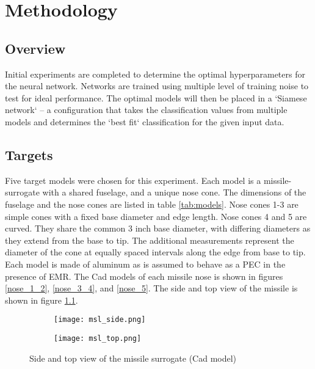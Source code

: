 \chapter{Methodology}
\label{ch:methodology}
\glsresetall

\section{Overview}

Initial experiments are completed to determine the optimal hyperparameters for the neural network. Networks are trained using multiple level of training noise to test for ideal performance. The optimal models will then be placed in a `Siamese network` --  a configuration that takes the classification values from multiple models and determines the `best fit` classification for the given input data.

\section{Targets}

  Five target models were chosen for this experiment. Each model is a missile-surrogate with a shared fuselage, and a unique nose cone. The dimensions of the fuselage and the nose cones are listed in table \ref{tab:models}. Nose cones 1-3 are simple cones with a fixed base diameter and edge length. Nose cones 4 and 5 are curved. They share the common 3 inch base diameter, with  differing diameters as they extend from the base to tip. The additional measurements represent the diameter of the cone at equally spaced intervals along the edge from base to tip. Each model is made of aluminum as is assumed to behave as a PEC in the presence of EMR. The Cad models of each missile nose is shown in figures \ref{nose_1_2}, \ref{nose_3_4}, and \ref{nose_5}. The side and top view of the missile is shown in figure \ref{fig:missile_body}.

  \begin{figure}[htbp]
    \centering
    \begin{subfigure}{.5\textwidth}
      \centering
      \texttt{[image: msl\_side.png]}
    \end{subfigure}%
    \begin{subfigure}{.5\textwidth}
      \centering
      \texttt{[image: msl\_top.png]}
    \end{subfigure}
    \caption{Side and top view of the missile surrogate (Cad model)}
    \label{fig:missile_body}
  \end{figure}


